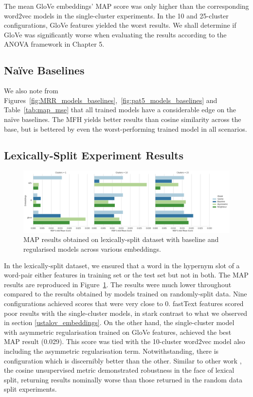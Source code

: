 The mean GloVe embeddings' \ac{MAP} score was only higher than the corresponding word2vec models in the single-cluster experiments.  In the 10 and 25-cluster configurations, GloVe features yielded the worst results.  We shall determine if GloVe was significantly worse when evaluating the results according to the \ac{ANOVA} framework in Chapter 5.

\subsection{Naïve Baselines}
We also note from Figures~\ref{fig:MRR_models_baselines},~\ref{fig:pat5_models_baselines} and Table~\ref{tab:map_mse} that all trained models have a considerable edge on the na\"ive baselines.  The \ac{MFH} yields better results than cosine similarity across the base, but is bettered by even the worst-performing trained model in all scenarios.  

\subsection{Lexically-Split Experiment Results}
\begin{figure}[ht!] 
  \centering
  \includegraphics[width=1.\linewidth]{images/MAP_lexical_split_results_models_baseline_embeddings.png}
  \caption{\ac{MAP} results obtained on lexically-split dataset with baseline and regularised models across various embeddings.}
  \label{fig:lexsplit_ustalov_map}
\end{figure}
In the lexically-split dataset, we ensured that a word in the hypernym slot of a word-pair either features in training set or the test set but not in both.  The \ac{MAP} results are reproduced in Figure~\ref{fig:lexsplit_ustalov_map}.  The results were much lower throughout compared to the results obtained by models trained on randomly-split data.  Nine configurations achieved scores that were very close to 0.  fastText features scored poor results with the single-cluster models, in stark contrast to what we observed in section \ref{ustalov_embeddings}.  On the other hand, the single-cluster model with asymmetric regularisation trained on GloVe features, achieved the best \ac{MAP} result (0.029).  This score was tied with the 10-cluster word2vec model also including the asymmetric regularisation term.  Notwithstanding, there is configuration which is discernibly better than the other.  Similar to other work \citep{shwartz2017siege}, the cosine unsupervised metric demonstrated robustness in the face of lexical split, returning results nominally worse than those returned in the random data split experiments.

